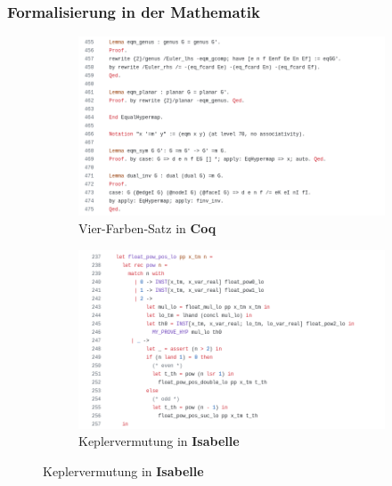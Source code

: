 \documentclass{beamer}
\theoremstyle{definition}
\theoremstyle{remark}
\begin{document}
\begin{frame}
	\frametitle{Formalisierung in der Mathematik}
 \begin{figure}
		\centering
		\begin{subfigure}[b]{0.45\textwidth}
						\includegraphics[width=\textwidth]{fourcolor.png}
						\caption{\tiny Vier-Farben-Satz in \textbf{Coq}}
		\end{subfigure}
		\hspace{0.5cm}
		\begin{subfigure}[b]{0.45\textwidth}
						\includegraphics[width=\textwidth]{kepler.png}
						\caption{\tiny Keplervermutung in \textbf{Isabelle}}
		\end{subfigure}


\end{figure}
\end{frame}
\end{document}
